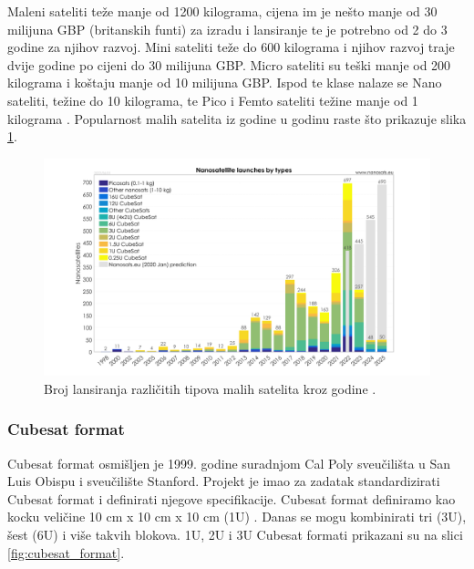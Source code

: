 \documentclass[times, utf8, diplomski, numeric]{templates/template}
\begin{document}
{{{            Maleni sateliti  teže manje od 1200 kilograma, cijena im je nešto manje od 30 milijuna GBP (britanskih funti) za izradu i lansiranje te je potrebno od 2 do 3 godine za njihov razvoj. Mini sateliti teže do 600 kilograma i njihov razvoj traje dvije godine po cijeni do 30 milijuna GBP. Micro sateliti su teški manje od 200 kilograma i koštaju manje od 10 milijuna GBP. Ispod te klase nalaze se Nano sateliti, težine do 10 kilograma, te Pico i Femto sateliti težine manje od 1 kilograma \cite{hrvatskiVojnik}. Popularnost malih satelita iz godine u godinu raste što prikazuje slika \ref{fig:lansiranja_po_godini}.

            \begin{figure}[htb]
            \centering
            \includegraphics[width=1.0\textwidth]{images/lansiranja_po_godini.png}
            \caption{Broj lansiranja različitih tipova malih satelita kroz godine \cite{nanosats}.}
            \label{fig:lansiranja_po_godini}
            \end{figure}
        }

            \subsubsection{Cubesat format}{
                Cubesat format osmišljen je 1999. godine suradnjom Cal Poly sveučilišta u San Luis Obispu i sveučilište Stanford. Projekt je imao za zadatak standardizirati Cubesat format i definirati njegove specifikacije. Cubesat format definiramo kao kocku veličine 10 cm x 10 cm x 10 cm (1U) \cite{fersat}. Danas se mogu kombinirati tri (3U), šest (6U) i više takvih blokova. 1U, 2U i 3U Cubesat formati prikazani su na slici \ref{fig:cubesat_format}.

}}}
\end{document}
